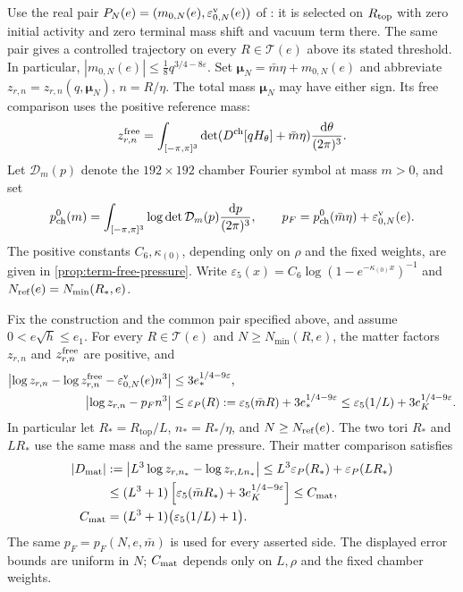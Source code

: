 Use the real pair
$P_N(e)=(m_{0,N}(e),\varepsilon_{0,N}^{\rm v}(e))$
of \cite[Theorem~D]{CoverTuning}: it is selected on
$R_{\rm top}$ with zero initial activity and zero terminal
mass shift and vacuum term there. The same pair gives a controlled
trajectory on every $R\in\mathcal T(e)$ above its stated threshold.
In particular,
$|m_{0,N}(e)|\le\frac18 q^{3/4-8\varepsilon}$.
Set $\boldsymbol\mu_N=\bar m\eta+m_{0,N}(e)$ and abbreviate
$z_{r,n}=z_{r,n}(q,\boldsymbol\mu_N)$, $n=R/\eta$.
The total mass $\boldsymbol\mu_N$ may have either sign.
Its free comparison uses the positive reference mass:
\[
 z_{r,n}^{\rm free}
   =\int_{[-\pi,\pi]^3}
        \det(D^{\rm ch}[qH_\theta]+\bar m\eta)
                      \frac{\mathrm d\theta}{(2\pi)^3}.
\]
Let $\mathcal D_m(p)$ denote the $192\times192$ chamber Fourier
symbol at mass $m>0$, and set
\begin{equation}\label{eq:term-common-pressure}
 p_{\rm ch}^0(m)=\int_{[-\pi,\pi]^3}
                   \log\det\mathcal D_m(p)\frac{\mathrm d p}{(2\pi)^3},
 \qquad
 p_F=p_{\rm ch}^0(\bar m\eta)+\varepsilon_{0,N}^{\rm v}(e).
\end{equation}
The positive constants $C_6,\kappa_{(0)}$, depending only on $\rho$
and the fixed weights, are given in
\cref{prop:term-free-pressure}. Write
$\varepsilon_5(x)=C_6\log(1-e^{-\kappa_{(0)}x})^{-1}$ and
$N_{\rm ref}(e)=N_{\min}(R_*,e)$.
\begin{theorem}\label{thm:term-common-partition}
Fix the construction and the common pair specified above, and
assume $0<e\sqrt h\le e_1$. For every $R\in\mathcal T(e)$ and
$N\ge N_{\min}(R,e)$, the matter factors $z_{r,n}$ and $z_{r,n}^{\rm free}$ are positive, and
\begin{align}
 \left|\log z_{r,n}-\log z_{r,n}^{\rm free}
                      -\varepsilon_{0,N}^{\rm v}(e)n^3\right|
          &\le3e_*^{1/4-9\varepsilon},\nonumber\\
 \left|\log z_{r,n}-p_Fn^3\right|
          &\le\varepsilon_P(R)
             :=\varepsilon_5(\bar mR)+3e_*^{1/4-9\varepsilon}
          \le\varepsilon_5(1/L)+3e_K^{1/4-9\varepsilon}.
                                     \label{eq:term-common-pressure-bound}
\end{align}
In particular let $R_*=R_{\mathrm{top}}/L$,
$n_*=R_*/\eta$, and $N\ge N_{\rm ref}(e)$.
The two tori $R_*$ and $LR_*$ use the same mass and
the same pressure. Their matter comparison satisfies
\begin{align}
 |D_{\rm mat}|
 &:=\left|L^3\log z_{r,n_*}-\log z_{r,Ln_*}\right|
       \le L^3\varepsilon_P(R_*)+\varepsilon_P(LR_*)
       \nonumber\\
 &\le (L^3+1)
          \left[\varepsilon_5(\bar mR_*)
                                      +3e_K^{1/4-9\varepsilon}\right]
       \le C_{\rm mat},\nonumber\\
 C_{\rm mat}&=(L^3+1)\bigl(\varepsilon_5(1/L)+1\bigr).
                                     \label{eq:term-matter-comparison}
\end{align}
The same $p_F=p_F(N,e,\bar m)$ is used for every asserted side.
The displayed error bounds are uniform in $N$; $C_{\rm mat}$
depends only on $L,\rho$ and the fixed chamber weights.
\end{theorem}

